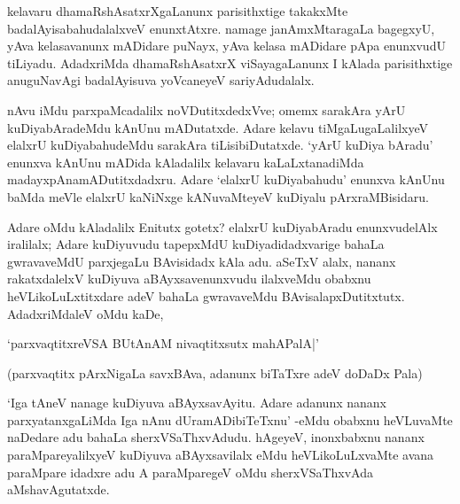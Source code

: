 kelavaru dhamaRshAsatxrXgaLanunx parisithxtige takakxMte badalAyisabahudalalxveV enunxtAtxre. namage janAmxMtaragaLa bagegxyU, yAva kelasavanunx mADidare puNayx, yAva kelasa mADidare pApa enunxvudU tiLiyadu. AdadxriMda dhamaRshAsatxrX viSayagaLanunx I kAlada parisithxtige anuguNavAgi badalAyisuva yoVcaneyeV sariyAdudalalx. 

nAvu iMdu parxpaMcadalilx noVDutitxdedxVve; omemx sarakAra yArU kuDiyabAradeMdu kAnUnu mADutatxde. Adare kelavu tiMgaLugaLalilxyeV elalxrU kuDiyabahudeMdu sarakAra tiLisibiDutatxde. `yArU kuDiya bAradu' enunxva kAnUnu mADida kAladalilx kelavaru kaLaLxtanadiMda madayxpAnamADutitxdadxru. Adare `elalxrU kuDiyabahudu' enunxva kAnUnu baMda meVle elalxrU kaNiNxge kANuvaMteyeV kuDiyalu pArxraMBisidaru.

Adare oMdu kAladalilx Enitutx gotetx? elalxrU kuDiyabAradu enunxvudelAlx iralilalx; Adare kuDiyuvudu tapepxMdU kuDiyadidadxvarige bahaLa gwravaveMdU parxjegaLu BAvisidadx kAla adu. aSeTxV alalx, nananx rakatxdalelxV kuDiyuva aBAyxsavenunxvudu ilalxveMdu obabxnu heVLikoLuLxtitxdare adeV bahaLa gwravaveMdu BAvisalapxDutitxtutx. AdadxriMdaleV oMdu kaDe, 

\begin{shloka}
`parxvaqtitxreVSA BUtAnAM nivaqtitxsutx mahAPalA|'
\end{shloka}

(parxvaqtitx pArxNigaLa savxBAva, adanunx biTaTxre adeV doDaDx Pala)

`Iga tAneV nanage kuDiyuva aBAyxsavAyitu. Adare adanunx nananx parxyatanxgaLiMda Iga nAnu dUramADibiTeTxnu' -eMdu obabxnu heVLuvaMte naDedare adu bahaLa sherxVSaThxvAdudu. hAgeyeV, inonxbabxnu nananx paraMpareyalilxyeV kuDiyuva aBAyxsavilalx eMdu heVLikoLuLxvaMte avana paraMpare idadxre adu A paraMparegeV oMdu sherxVSaThxvAda aMshavAgutatxde. 

